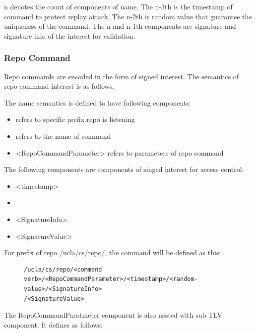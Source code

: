 \documentclass{acm_proc_article-sp}
\begin{document}
n denotes the count of components of name. The n-3th is the timestamp of command to protect replay attack. The n-2th is random value that guarantee the uniqueness of the command. The n and n-1th components are signature and signature info of the interest for validation.

\subsubsection{Repo Command}
Repo commands are encoded in the form of signed interest. The semantics of repo command interest is as follows.

The name semantics is defined to have following components:

\begin{itemize}
\item <repo prefix> refers to specific prefix repo is listening
\item <command verb> refers to the name of command
\item <RepoCommandParameter> refers to parameters of repo command
\end{itemize}

The following components are components of singed interest for access control:
\begin{itemize}
\item <timestamp>
\item <random-value>
\item <SignatureInfo>
\item <SignatureValue>
\end{itemize}

For prefix of repo /ucla/cs/repo/, the command will be defined as this:

\begin{figure}
\begin{framed}
\begin{BVerbatim}
/ucla/cs/repo/<command verb>/<RepoCommandParameter>/<timestamp>/<random-value>/<SignatureInfo>
/<SignatureValue>
\end{BVerbatim}
\end{framed}
\end{figure}

The RepoCommandParatmeter component is also nested with sub TLV component. It defines as follows:
\end{document}
